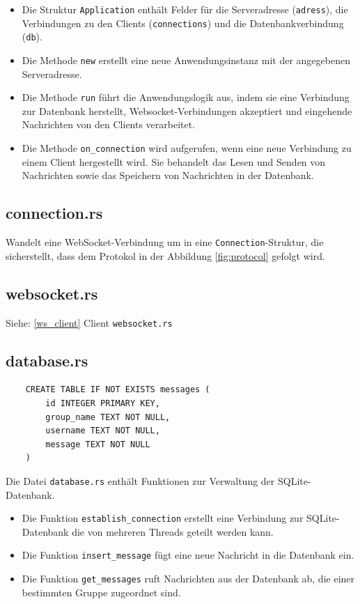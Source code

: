 \documentclass[a4paper]{article}
\begin{document}
\begin{itemize}
    \item Die Struktur \texttt{Application} enthält Felder für die Serveradresse (\texttt{adress}), die Verbindungen zu den Clients (\texttt{connections}) und die Datenbankverbindung (\texttt{db}).
    \item Die Methode \texttt{new} erstellt eine neue Anwendungsinstanz mit der angegebenen Serveradresse.
    \item Die Methode \texttt{run} führt die Anwendungslogik aus, indem sie eine Verbindung zur Datenbank herstellt, Websocket-Verbindungen akzeptiert und eingehende Nachrichten von den Clients verarbeitet.
    \item Die Methode \texttt{on\_connection} wird aufgerufen, wenn eine neue Verbindung zu einem Client hergestellt wird. Sie behandelt das Lesen und Senden von Nachrichten sowie das Speichern von Nachrichten in der Datenbank.
\end{itemize}

\subsection{connection.rs}

Wandelt eine WebSocket-Verbindung um in eine \texttt{Connection}-Struktur, die sicherstellt, dass dem Protokol in der Abbildung \ref{fig:protocol} gefolgt wird.

\subsection{websocket.rs}

Siehe: \ref{ws_client} Client \texttt{websocket.rs}


\subsection{database.rs}


\begin{verbatim}
    CREATE TABLE IF NOT EXISTS messages (
        id INTEGER PRIMARY KEY,
        group_name TEXT NOT NULL,
        username TEXT NOT NULL,
        message TEXT NOT NULL
    )
\end{verbatim}


Die Datei \texttt{database.rs} enthält Funktionen zur Verwaltung der SQLite-Datenbank.




\begin{itemize}
    \item Die Funktion \texttt{establish\_connection} erstellt eine Verbindung zur SQLite-Datenbank die von mehreren Threads geteilt werden kann.
    \item Die Funktion \texttt{insert\_message} fügt eine neue Nachricht in die Datenbank ein.
    \item Die Funktion \texttt{get\_messages} ruft Nachrichten aus der Datenbank ab, die einer bestimmten Gruppe zugeordnet sind.
\end{itemize}
\end{document}
